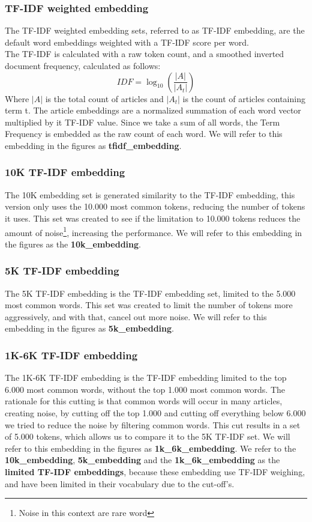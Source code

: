 \documentclass[../../Thesis.tex]{subfiles}
\begin{document}
\subsubsection{TF-IDF weighted embedding}
The TF-IDF weighted embedding sets, referred to as TF-IDF embedding, are the default word embeddings weighted with a TF-IDF score per word.\\
The TF-IDF is calculated with a raw token count, and a smoothed inverted document frequency, calculated as follows:\\
\begin{equation}
IDF = \log_{10}(\dfrac{|A|}{|A_t|})
\end{equation}
Where $|A|$ is the total count of articles and $|A_t|$ is the count of articles containing term t.
The article embeddings are a normalized summation of each word vector multiplied by it TF-IDF value. Since we take a sum of all words, the Term Frequency is embedded as the raw count of each word. We will refer to this embedding in the figures as \textbf{tfidf\_embedding}.
\subsubsection{10K TF-IDF embedding}
The 10K embedding set is generated similarity to the TF-IDF embedding, this version only uses the 10.000 most common tokens, reducing the number of tokens it uses. This set was created to see if the limitation to 10.000 tokens reduces the amount of noise\footnote{Noise in this context are rare word}, increasing the performance. We will refer to this embedding in the figures as the \textbf{10k\_embedding}.
\subsubsection{5K TF-IDF embedding}
The 5K TF-IDF embedding is the TF-IDF embedding set, limited to the 5.000 most common words. This set was created to limit the number of tokens more aggressively, and with that, cancel out more noise. We will refer to this embedding in the figures as \textbf{5k\_embedding}.
\subsubsection{1K-6K TF-IDF embedding}
The 1K-6K TF-IDF embedding is the TF-IDF embedding limited to the top 6.000 most common words, without the top 1.000 most common words. The rationale for this cutting is that common words will occur in many articles, creating noise, by cutting off the top 1.000 and cutting off everything below 6.000 we tried to reduce the noise by filtering common words. This cut results in a set of 5.000 tokens, which allows us to compare it to the 5K TF-IDF set. We will refer to this embedding in the figures as \textbf{1k\_6k\_embedding}. We refer to the \textbf{10k\_embedding}, \textbf{5k\_embedding} and the \textbf{1k\_6k\_embedding} as the \textbf{limited TF-IDF embeddings}, because these embedding use TF-IDF weighing, and have been limited in their vocabulary due to the cut-off's.
\end{document}
